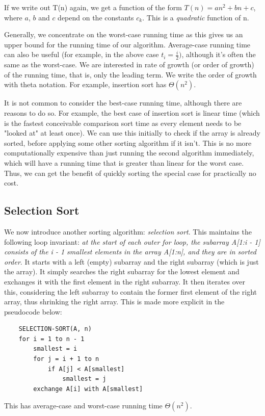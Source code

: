 \documentclass[12pt]{article}
\begin{document}
If we write out T(n) again, we get a function of the form $T(n) = an^2 + bn + c$, where $a$, $b$ and $c$ depend
on the constants $c_k$. This is a \textit{quadratic} function of n.

Generally, we concentrate on the worst-case running time as this gives us an upper bound for the running
time of our algorithm. Average-case running time can also be useful (for example, in the above case $t_i = \frac{i}{2})$,
although it's often the same as the worst-case. We are interested in rate of growth (or order of growth) of the running
time, that is, only the leading term. We write the order of growth with theta notation. For example, insertion
sort has $\Theta(n^2)$.

It is not common to consider the best-case running time, although there are reasons to do so. For example, the
best case of insertion sort is linear time (which is the fastest conceivable comparison sort time as every element needs to
be "looked at" at least once). We can use this initially to check if the array is already sorted, before applying
some other sorting algorithm if it isn't. This is no more computationally expensive than just running the
second algorithm immediately, which will have a running time that is greater than linear for the worst case.
Thus, we can get the benefit of quickly sorting the special case for practically no cost.

\subsection{Selection Sort}
We now introduce another sorting algorithm: \textit{selection sort}. This maintains the following loop
invariant: \textit{at the start of each outer for loop, the subarray A[1:i - 1] consists of the i - 1 smallest
elements in the array A[1:n], and they are in sorted order}. It starts with a left (empty) subarray and
the right subarray (which is just the array). It simply searches the right subarray for the
lowest element and exchanges it with the first element in the right subarray. It then iterates over this, considering
the left subarray to contain the former first element of the right array, thus shrinking the right array. This is made more
explicit in the pseudocode below:
\begin{lstlisting}
    SELECTION-SORT(A, n)
    for i = 1 to n - 1
        smallest = i
        for j = i + 1 to n
            if A[j] < A[smallest]
                smallest = j
        exchange A[i] with A[smallest]
\end{lstlisting}
This has average-case and worst-case running time $\Theta(n^2)$.
\end{document}
